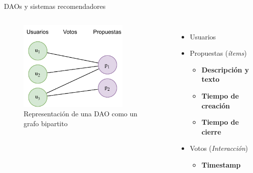 \begin{frame}{DAOs y sistemas recomendadores}
    \begin{columns}
        \begin{figure}
            \centering
            \includegraphics[height=44mm]{images/diagrams/dao-as-a-graph.drawio.pdf}
            \caption{Representación de una DAO como un grafo bipartito}
        \end{figure}
        \begin{itemize}
            \item Usuarios
            \item Propuestas (\textit{ítems})
            \begin{itemize}
                \item \textbf{Descripción y texto}
                \item \textbf{Tiempo de creación}
                \item \textbf{Tiempo de cierre}
            \end{itemize}
            \item Votos (\textit{Interacción})
            \begin{itemize}
                \item \textbf{Timestamp}
            \end{itemize}
        \end{itemize}
    \end{columns}

\end{frame}

